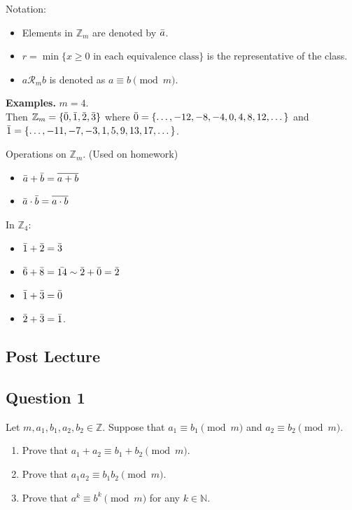 \documentclass{article}
\begin{document}
    \vspace{1.5mm}
    Notation:
    \begin{itemize}
        \item Elements in $\mathbb{Z}_{m}$ are denoted by $\Bar{a}$.
        \item $r = \min \{x \ge 0 \text{ in each equivalence class}\}$ is the representative of the class.
        \item $a \mathcal{R}_{m} b$ is denoted as $a \equiv b \pmod{m}$.
    \end{itemize}
    
    \vspace{1.5mm}
    \textbf{Examples. }
    $m = 4$. \\
    Then $\mathbb{Z}_{m} = \{\Bar{0}, \Bar{1}, \Bar{2}, \Bar{3}\}$ where $\Bar{0} = \{\dots, -12, -8, -4, 0, 4, 8, 12, \dots\}$ and $\Bar{1} = \{\dots, -11, -7, -3, 1, 5, 9, 13, 17, \dots\}$.
    
    Operations on $\mathbb{Z}_{m}$. (Used on homework)
    \begin{itemize}
        \item $\Bar{a} + \Bar{b} = \overline{a + b}$
        \item $\Bar{a} \cdot \Bar{b} = \overline{a \cdot b}$
    \end{itemize}
    In $\mathbb{Z}_{4}$:
    \begin{itemize}
        \item $\Bar{1} + \Bar{2} = \Bar{3}$
        \item $\Bar{6} + \Bar{8} = \Bar{14} \sim \Bar{2} + \Bar{0} = \Bar{2}$
        \item $\Bar{1} + \Bar{3} = \Bar{0}$
        \item $\Bar{2} + \Bar{3} = \Bar{1}$.
    \end{itemize}

\subsection*{Post Lecture}

\subsection*{Question 1}
    Let $m, a_1, b_1, a_2, b_2 \in \mathbb{Z}$. Suppose that $a_1 \equiv b_1 \pmod m$ and $a_2 \equiv b_2 \pmod m$.
    \begin{enumerate}
        \item Prove that $a_1 + a_2 \equiv b_1 + b_2 \pmod m$.
        \item Prove that $a_1a_2 \equiv b_1b_2 \pmod m$.
        \item Prove that $a^{k} \equiv b^{k} \pmod m$ for any $k \in \mathbb{N}$.
    \end{enumerate}
\end{document}
